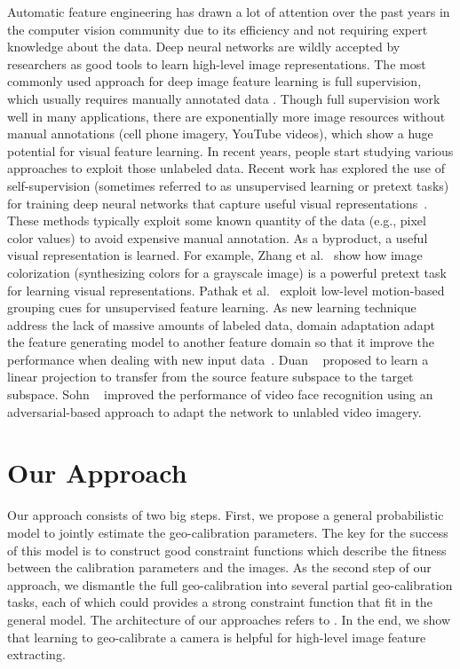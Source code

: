 Automatic feature engineering has drawn a lot of attention over the
past years in the computer vision community due to its efficiency and
not requiring expert knowledge about the data. Deep neural networks
are wildly accepted by researchers as good tools to learn high-level
image representations.
The most commonly used approach for deep image feature learning is
full supervision, which usually requires manually annotated data
.
Though full supervision work well in many applications, there are
exponentially more image resources without manual annotations (cell
phone imagery, YouTube videos\etc), which show a huge potential for
visual feature learning.  In recent years, people start studying
various approaches to exploit those unlabeled data. 
%
Recent work has explored the use of self-supervision (sometimes
referred to as unsupervised learning or pretext tasks) for training
deep neural networks that capture useful visual
representations~\cite{doersch2015unsupervised,pathak2016context}. 
These methods typically
exploit some known quantity of the data (e.g., pixel color values) to
avoid expensive manual annotation. As a byproduct, a useful visual
representation is learned.
For example, Zhang et al.~\cite{zhang2016colorful} show how image
colorization (synthesizing colors for a grayscale image) is a powerful
pretext task for learning visual representations. Pathak et
al.~\cite{pathak2017learning} exploit low-level motion-based grouping
cues for unsupervised feature learning.  
%
As new learning technique address the lack of massive amounts of
labeled data, domain adaptation adapt the feature generating model to
another feature domain so that it improve the performance when dealing
with new input
data~\cite{fernando2013unsupervised,fernando2015joint,saenko2010adapting,wang2016actions,tinghui2016flow}.
Duan \etal~\cite{duan2012learning} proposed to learn a linear
projection to transfer from the source feature subspace to the target
subspace. Sohn \etal~\cite{sohn2017unsupervised} improved the
performance of video face recognition using an adversarial-based
approach to adapt the network to unlabled video imagery.


\section{Our Approach}
Our approach consists of two big steps. First, we propose a general
probabilistic model to jointly estimate the geo-calibration
parameters. The key for the success of this model is to construct good
constraint functions which describe the fitness between the calibration
parameters and the images. As the second step of our approach, we
dismantle the full geo-calibration into several partial
geo-calibration tasks, each of which could provides a strong constraint
function that fit in the general model. The architecture of
our approaches refers to .
%
In the end, we show that learning to geo-calibrate a camera is helpful
for high-level image feature extracting.


